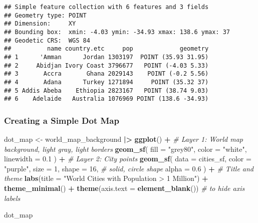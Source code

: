 \documentclass[
]{article}
\newenvironment{Shaded}{\begin{snugshade}}{\end{snugshade}}
\newcommand{\AttributeTok}[1]{\textcolor[rgb]{0.13,0.29,0.53}{#1}}
\newcommand{\CommentTok}[1]{\textcolor[rgb]{0.56,0.35,0.01}{\textit{#1}}}
\newcommand{\DecValTok}[1]{\textcolor[rgb]{0.00,0.00,0.81}{#1}}
\newcommand{\FloatTok}[1]{\textcolor[rgb]{0.00,0.00,0.81}{#1}}
\newcommand{\FunctionTok}[1]{\textcolor[rgb]{0.13,0.29,0.53}{\textbf{#1}}}
\newcommand{\NormalTok}[1]{#1}
\newcommand{\OtherTok}[1]{\textcolor[rgb]{0.56,0.35,0.01}{#1}}
\newcommand{\SpecialCharTok}[1]{\textcolor[rgb]{0.81,0.36,0.00}{\textbf{#1}}}
\newcommand{\StringTok}[1]{\textcolor[rgb]{0.31,0.60,0.02}{#1}}
\begin{document}
\begin{verbatim}
## Simple feature collection with 6 features and 3 fields
## Geometry type: POINT
## Dimension:     XY
## Bounding box:  xmin: -4.03 ymin: -34.93 xmax: 138.6 ymax: 37
## Geodetic CRS:  WGS 84
##          name country.etc     pop             geometry
## 1      'Amman      Jordan 1303197  POINT (35.93 31.95)
## 2     Abidjan Ivory Coast 3796677   POINT (-4.03 5.33)
## 3       Accra       Ghana 2029143    POINT (-0.2 5.56)
## 4       Adana      Turkey 1271894     POINT (35.32 37)
## 5 Addis Abeba    Ethiopia 2823167   POINT (38.74 9.03)
## 6    Adelaide   Australia 1076969 POINT (138.6 -34.93)
\end{verbatim}

\subsubsection{Creating a Simple Dot
Map}\label{creating-a-simple-dot-map}

\begin{Shaded}
\begin{Highlighting}[]
\NormalTok{dot\_map }\OtherTok{\textless{}{-}}\NormalTok{ world\_map\_background }\SpecialCharTok{|\textgreater{}} 
  \FunctionTok{ggplot}\NormalTok{() }\SpecialCharTok{+}
  \CommentTok{\# Layer 1: World map background, light gray, light borders}
  \FunctionTok{geom\_sf}\NormalTok{(}
    \AttributeTok{fill =} \StringTok{"grey80"}\NormalTok{,}
    \AttributeTok{color =} \StringTok{"white"}\NormalTok{,}
    \AttributeTok{linewidth =} \FloatTok{0.1}
\NormalTok{  ) }\SpecialCharTok{+}
  \CommentTok{\# Layer 2: City points}
  \FunctionTok{geom\_sf}\NormalTok{(}
    \AttributeTok{data =}\NormalTok{ cities\_sf,}
    \AttributeTok{color =} \StringTok{"purple"}\NormalTok{,}
    \AttributeTok{size =} \DecValTok{1}\NormalTok{,}
    \AttributeTok{shape =} \DecValTok{16}\NormalTok{, }\CommentTok{\# solid, circle shape}
    \AttributeTok{alpha =} \FloatTok{0.6}
\NormalTok{  ) }\SpecialCharTok{+}
  \CommentTok{\# Title and theme}
  \FunctionTok{labs}\NormalTok{(}\AttributeTok{title =} \StringTok{"World Cities with Population \textgreater{} 1 Million"}\NormalTok{) }\SpecialCharTok{+}
  \FunctionTok{theme\_minimal}\NormalTok{() }\SpecialCharTok{+}
  \FunctionTok{theme}\NormalTok{(}\AttributeTok{axis.text =} \FunctionTok{element\_blank}\NormalTok{()) }\CommentTok{\# to hide axis labels}

\NormalTok{dot\_map}
\end{Highlighting}
\end{Shaded}
\end{document}
